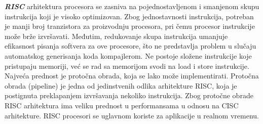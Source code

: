 \documentclass[10pt]{extarticle}
\begin{document}
\textit{\textbf{RISC}} arhitektura procesora se zasniva na pojednostavljenom i smanjenom skupu instrukcija koji je visoko optimizovan. Zbog jednostavnosti instrukcija, potreban je manji broj tranzistora za proizvodnju procesora, pri čemu procesor instrukcije može brže izvršavati. Međutim, redukovanje skupa instrukcija umanjuje efikasnost pisanja softvera za ove procesore, što ne predstavlja problem u slučaju automatskog generisanja koda kompajlerom. Ne postoje složene instrukcije koje pristupaju memoriji, već se rad sa memorijom svodi na load i store instrukcije. Najveća prednost je protočna obrada, koja se lako može implementirati. Protočna obrada (pipeline) je jedna od jedinstvenih odlika arhitekture RISC, koja je postignuta preklapanjem izvršavanja nekoliko instrukcija. Zbog protočne obrade RISC arhitektura ima veliku prednost u performansama u odnosu na CISC arhitekture. RISC procesori se uglavnom koriste za aplikacije u realnom vremenu. 
\end{document}
